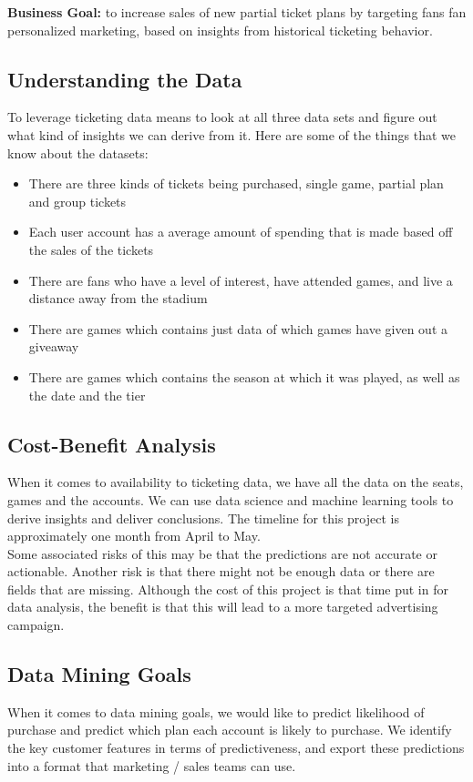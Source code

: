 \documentclass[a4paper]{article}
\begin{document}
\noindent \textbf{Business Goal:} to increase sales of new partial ticket plans by targeting fans fan personalized 
marketing, based on insights from historical ticketing behavior.

\subsection{Understanding the Data}
To leverage ticketing data means to look at all three data sets and figure out what kind of insights we can derive 
from it. Here are some of the things that we know about the datasets:
\begin{itemize}
    \item There are three kinds of tickets being purchased, single game, partial plan and group tickets
    \item Each user account has a average amount of spending that is made based off the sales of the tickets
    \item There are fans who have a level of interest, have attended games, and live a distance away from the stadium
    \item There are games which contains just data of which games have given out a giveaway
    \item There are games which contains the season at which it was played, as well as the date and the tier
\end{itemize}

\subsection{Cost-Benefit Analysis}
When it comes to availability to ticketing data, we have all the data on the seats, games and the accounts. We can use
data science and machine learning tools to derive insights and deliver conclusions. The timeline for this project is
approximately one month from April to May. \\

\noindent Some associated risks of this may be that the predictions are not accurate or actionable. Another risk is 
that there might not be enough data or there are fields that are missing. Although the cost of this project is that 
time put in for data analysis, the benefit is that this will lead to a more targeted advertising campaign.

\subsection{Data Mining Goals}
When it comes to data mining goals, we would like to predict likelihood of purchase and predict which plan each 
account is likely to purchase. We identify the key customer features in terms of predictiveness, and export these 
predictions into a format that marketing / sales teams can use.
\end{document}
